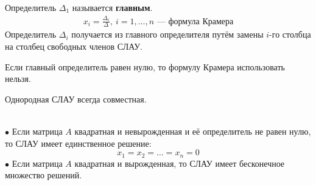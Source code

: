 Определитель $\Delta_1$ называется \textbf{главным}. \vspace{-\topsep}
\begin{gather*}
\boxed{x_i = \frac{\Delta_i}{\Delta}},\ i = 1,\ldots,n \textbf{ --- формула Крамера}
\end{gather*} %
Определитель $\Delta_i$ получается из главного определителя путём замены $i$-го столбца на столбец свободных членов СЛАУ.
\begin{remark}
Если главный определитель равен нулю, то формулу Крамера использовать нельзя.
\end{remark}
\begin{note}
Однородная СЛАУ всегда совместная. 
\end{note}
\begin{note}\ \\
$\bullet$ Если матрица $A$ квадратная и невырожденная и её определитель не равен нулю, то СЛАУ имеет единственное решение: \[
x_1 = x_2 = \ldots = x_n = 0 \]
$\bullet$ Если матрица $A$ квадратная и вырожденная, то СЛАУ имеет бесконечное множество решений.
\end{note}
\setcounter{equation}{0}
